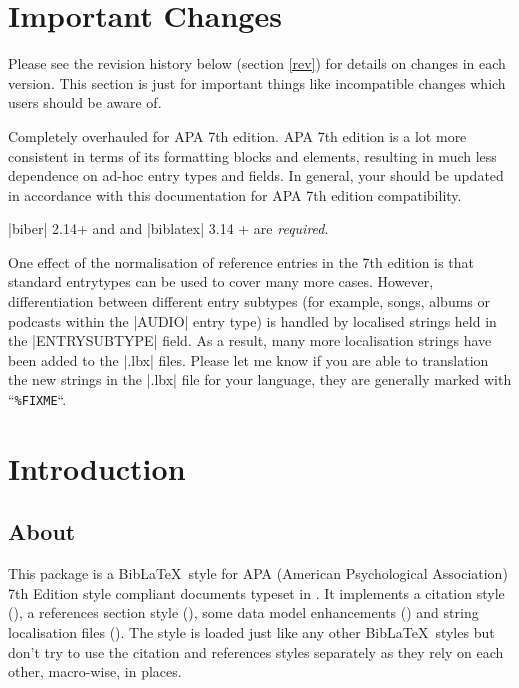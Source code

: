 \documentclass{ltxdockit}
\begin{document}
\printtitlepage
\tableofcontents

\section{Important Changes}\label{special}

Please see the revision history below (section \ref{rev}) for  details on changes in each
version. This section is just for important things like incompatible
changes which users should be aware of.

Completely overhauled for APA 7th edition. APA 7th edition is a lot more
consistent in terms of its formatting blocks and elements, resulting in
much less dependence on ad-hoc entry types and fields. In general, your
 should be updated in accordance with this documentation for APA
7th edition compatibility. 

\noindent |biber| 2.14+ and and |biblatex| 3.14 + are \emph{required}.

One effect of the normalisation of reference entries in the 7th edition is
that standard entrytypes can be used to cover many more cases. However,
differentiation between different entry subtypes (for example, songs,
albums or podcasts within the |AUDIO| entry type) is handled by localised
strings held in the |ENTRYSUBTYPE| field. As a result, many more
localisation strings have been added to the |.lbx| files. Please let me
know if you are able to translation the new strings in the |.lbx| file for
your language, they are generally marked with ``\texttt{\%FIXME}``.

\section{Introduction}\label{int}

\subsection{About}

This package is a Bib\LaTeX\ style for APA (American Psychological
Association) 7th Edition style compliant documents typeset in \latex. It
implements a citation style (), a references section style
(), some data model enhancements () and string
localisation files (). The style is loaded just
like any other Bib\LaTeX\ styles but don't try to use the citation and
references styles separately as they rely on each other, macro-wise, in
places.
\end{document}
